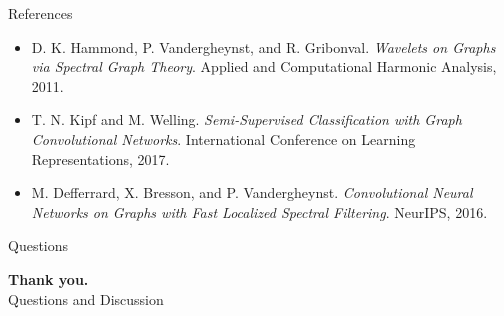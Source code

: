 \documentclass[aspectratio=1610,xcolor=dvipsnames,t]{beamer}
\begin{document}
\begin{frame}{References}
\small
\begin{itemize}
  \item D. K. Hammond, P. Vandergheynst, and R. Gribonval.\newline
  \textit{Wavelets on Graphs via Spectral Graph Theory}.\newline
  Applied and Computational Harmonic Analysis, 2011.

  \item T. N. Kipf and M. Welling.\newline
  \textit{Semi-Supervised Classification with Graph Convolutional Networks}.\newline
  International Conference on Learning Representations, 2017.

  \item M. Defferrard, X. Bresson, and P. Vandergheynst.\newline
  \textit{Convolutional Neural Networks on Graphs with Fast Localized Spectral Filtering}.\newline
  NeurIPS, 2016.
\end{itemize}
\end{frame}

\begin{frame}{Questions}
\vfill
\begin{center}
{\Huge\color{unirot}\textbf{Thank you.}}\\[0.4cm]
{\Large Questions and Discussion}
\end{center}
\vfill
\end{frame}
\end{document}
